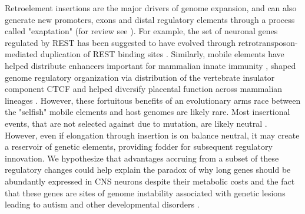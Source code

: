Retroelement insertions are the major drivers of genome expansion, and can also generate new promoters, exons and distal regulatory elements through a process called "exaptation" (for review see \citealt{Chuong_2016}). For example, the set of neuronal genes regulated by REST has been suggested to have evolved through retrotransposon-mediated duplication of REST binding sites \citep{Johnson_2006}. Similarly, mobile elements have helped distribute enhancers important for mammalian innate immunity \cite{Chuong_2016a}, shaped genome regulatory organization via distribution of the vertebrate insulator component CTCF \citep{Schmidt_2012} and helped diversify placental function across mammalian lineages \citep{Chuong_2013}. However, these fortuitous benefits of an evolutionary arms race between the "selfish" mobile elements and host genomes are likely rare. Most insertional events, that are not selected against due to mutation, are likely neutral \cite{Zhang_2011}. However, even if elongation through insertion is on balance neutral, it may create a reservoir of genetic elements, providing fodder for subsequent regulatory innovation. We hypothesize that advantages accruing from a subset of these regulatory changes could help explain the paradox of why long genes should be abundantly expressed in CNS neurons despite their metabolic costs and the fact that these genes are sites of genome instability associated with genetic lesions leading to autism and other developmental disorders \citep{Wei_2016}. 





